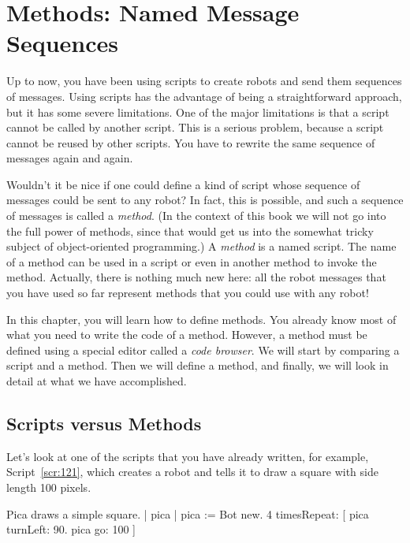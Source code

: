 \documentclass[a4paper,10pt,twoside]{book}
\begin{document}
    \sloppy
\fi

\chapter{Methods: Named Message Sequences}\label{cha:methods}

Up to now, you have been using scripts to create robots and send them sequences of messages. 
Using scripts has the advantage of being a straightforward approach, but it has some 
severe limitations. One of the major limitations is that a script cannot be called by another 
script. This is a serious problem, because a script cannot be reused by other scripts. You have 
to rewrite the same sequence of messages again and again. 

Wouldn’t it be nice if one could define a kind of script whose sequence of messages could 
be sent to any robot? In fact, this is possible, and such a sequence of messages is called a 
\emph{method}. (In the context of this book we will not go into the full power of methods, since that 
would get us into the somewhat tricky subject of object-oriented programming.) A \emph{method} is 
a named script. The name of a method can be used in a script or even in another method to 
invoke the method. Actually, there is nothing much new here: all the robot messages that you 
have used so far represent methods that you could use with any robot! 

In this chapter, you will learn how to define methods. You already know most of what you 
need to write the code of a method. However, a method must be defined using a special editor 
called a \emph{code browser}. We will start by comparing a script and a method. Then we will define a 
method, and finally, we will look in detail at what we have accomplished. 

\section{Scripts versus Methods}

Let’s look at one of the scripts that you have already written, for example, Script~\ref{scr:121}, which 
creates a robot and tells it to draw a square with side length 100 pixels. 

\begin{script}[121]{Pica draws a simple square.}
| pica | 
pica := Bot new. 
4 timesRepeat: 
	[ pica turnLeft: 90. 
	pica go: 100 ] 
\end{script}
\end{document}
